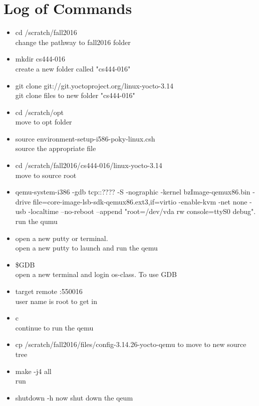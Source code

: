 \documentclass[letterpaper,10pt]{article}
\begin{document}
\section{Log of Commands}
    \begin{itemize}
    \item cd /scratch/fall2016\\
    change the pathway to fall2016 folder

    \item mkdir cs444-016\\
    create a new folder called "cs444-016"

    \item git clone git://git.yoctoproject.org/linux-yocto-3.14\\
    git clone files to new folder "cs444-016"

    \item cd /scratch/opt\\
    move to opt folder

    \item source environment-setup-i586-poky-linux.csh\\
    source the appropriate file

    \item cd /scratch/fall2016/cs444-016/linux-yocto-3.14\\
    move to source root

    \item qemu-system-i386 -gdb tcp::???? -S -nographic -kernel bzImage-qemux86.bin -drive file=core-image-lsb-sdk-qemux86.ext3,if=virtio -enable-kvm -net none -usb -localtime --no-reboot --append "root=/dev/vda rw console=ttyS0 debug".\\
    run the qumu 

    \item open a new putty or terminal.\\
    open a new putty to launch and run the qemu

    \item \$GDB\\
    open a new terminal and login os-class. To use GDB

    \item target remote :550016\\
    user name is root to get in 

    \item c\\
    continue to run the qemu

    \item cp /scratch/fall2016/files/config-3.14.26-yocto-qemu to
    move to new source tree

    \item make -j4 all\\ 
    run 

    \item shutdown -h now
    shut down the qeum


    \end{itemize}
\end{document}
